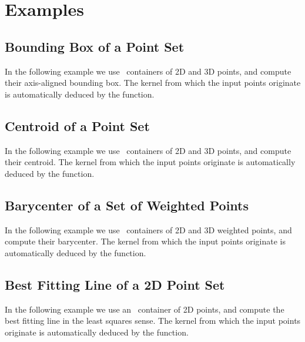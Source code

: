 

\minitoc




\section{Examples\label{subsec:pca_examples}}

\subsection{Bounding Box of a Point Set}

In the following example we use \stl\ containers of 2D and 3D points, and compute their axis-aligned bounding box. The kernel from which the input points originate is automatically deduced by the function.


\subsection{Centroid of a Point Set}

In the following example we use \stl\ containers of 2D and 3D points, and compute their centroid. The kernel from which the input points originate is automatically deduced by the function.


\subsection{Barycenter of a Set of Weighted Points}

In the following example we use \stl\ containers of 2D and 3D weighted points, and compute their barycenter. The kernel from which the input points originate is automatically deduced by the function.


\subsection{Best Fitting Line of a 2D Point Set}

In the following example we use an \stl\ container of 2D points, and compute the best fitting line in the least squares sense. The kernel from which the input points originate is automatically deduced by the function.


